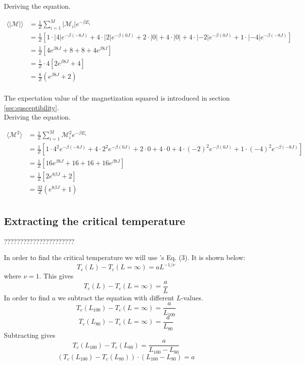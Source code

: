 \documentclass{article}
\begin{document}
Deriving the equation.

\begin{align*}
    \langle | \mathcal{M} | \rangle &= \frac{1}{Z} \sum _{i=1} ^M |\mathcal{M}_i| e^{- \beta E_i} \\
    &= \frac{1}{Z} \left[1 \cdot |4| e^{- \beta (-8J)} + 4 \cdot |2| e^{- \beta (0J)} + 2 \cdot |0| + 4 \cdot |0| + 4 \cdot |-2|
    e^{- \beta (0J)} + 1 \cdot |-4| e^{- \beta (-8J)} \right] \\
    &= \frac{1}{Z} \left[ 4 e^{\beta 8J} + 8 + 8 + 4 e^{ \beta 8J} \right] \\
    &= \frac{1}{Z} \cdot 4 \left[ 2 e^{\beta 8J} + 4 \right] \\
    &= \frac{8}{Z} \left( e^{\beta 8J} + 2 \right) \\
\end{align*}

The expectation value of the magnetization squared is introduced in section \ref{sec:susceptibility}. \\

Deriving the equation.

\begin{align*}
  \langle \mathcal{M}^2 \rangle &= \frac{1}{Z} \sum _{i=1} ^M \mathcal{M}_i^2 e^{- \beta E_i} \\
  &= \frac{1}{Z} \left[1 \cdot 4^2 e^{- \beta (-8J)} + 4 \cdot 2^2 e^{- \beta (0J)} + 2 \cdot 0 + 4 \cdot 0 + 4 \cdot (-2)^2 e^{- \beta (0J)} + 1 \cdot (-4)^2 e^{- \beta (-8J)} \right] \\
  &= \frac{1}{Z} \left[ 16 e^{\beta 8J} + 16 + 16 + 16 e^{ \beta 8J} \right] \\
  &= \frac{1}{Z} \left[ 2 e^{8 \beta J} + 2 \right] \\
  &= \frac{32}{Z} \left( e^{8 \beta J} + 1 \right) \\
\end{align*}


\subsection{Extracting the critical temperature} ??????????????????????

In order to find the critical temperature we will use \cite{task}'s Eq. (3). It is shown below:
$$T_c(L)-T_c(L=\infty)=aL^{-1/\nu}$$
where $\nu=1$. This gives
$$T_c(L)-T_c(L=\infty)=\frac{a}{L}$$
In order to find $a$ we subtract the equation with different $L$-values.
$$T_c(L_{100})-T_c(L=\infty)=\frac{a}{L_{100}}$$
$$T_c(L_{80})-T_c(L=\infty)=\frac{a}{L_{80}}$$
Subtracting gives
$$T_c(L_{100})-T_c(L_{80})=\frac{a}{L_{100}-L_{80}}$$
$$(T_c(L_{100})-T_c(L_{80}))\cdot(L_{100}-L_{80})=a$$ \label{eq:finding-a}






\end{document}
